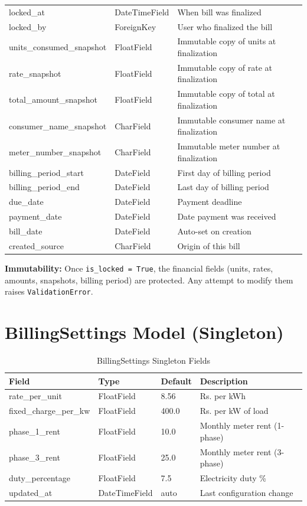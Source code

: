 \documentclass[12pt, a4paper]{report}
\begin{document}
\begin{table}[H]
\begin{tabularx}{\textwidth}{>{\ttfamily}l l X}
locked\_at & DateTimeField & When bill was finalized \\
locked\_by & ForeignKey & User who finalized the bill \\
units\_consumed\_snapshot & FloatField & Immutable copy of units at finalization \\
rate\_snapshot & FloatField & Immutable copy of rate at finalization \\
total\_amount\_snapshot & FloatField & Immutable copy of total at finalization \\
consumer\_name\_snapshot & CharField & Immutable consumer name at finalization \\
meter\_number\_snapshot & CharField & Immutable meter number at finalization \\
billing\_period\_start & DateField & First day of billing period \\
billing\_period\_end & DateField & Last day of billing period \\
due\_date & DateField & Payment deadline \\
payment\_date & DateField & Date payment was received \\
bill\_date & DateField & Auto-set on creation \\
created\_source & CharField & Origin of this bill \\
\bottomrule
\end{tabularx}
\end{table}

\textbf{Immutability:} Once \texttt{is\_locked = True}, the financial fields (units, rates, amounts, snapshots, billing period) are protected. Any attempt to modify them raises \texttt{ValidationError}.

\section{BillingSettings Model (Singleton)}

\begin{table}[H]
\centering
\caption{BillingSettings Singleton Fields}
\begin{tabularx}{\textwidth}{>{\ttfamily}l l l X}
\toprule
\textbf{Field} & \textbf{Type} & \textbf{Default} & \textbf{Description} \\
\midrule
rate\_per\_unit & FloatField & 8.56 & Rs. per kWh \\
fixed\_charge\_per\_kw & FloatField & 400.0 & Rs. per kW of load \\
phase\_1\_rent & FloatField & 10.0 & Monthly meter rent (1-phase) \\
phase\_3\_rent & FloatField & 25.0 & Monthly meter rent (3-phase) \\
duty\_percentage & FloatField & 7.5 & Electricity duty \% \\
updated\_at & DateTimeField & auto & Last configuration change \\
\bottomrule
\end{tabularx}
\end{table}
\end{document}
